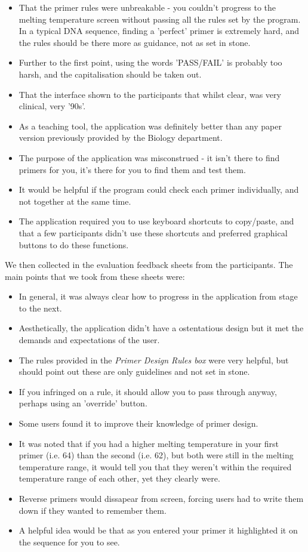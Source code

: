\begin{itemize}

\item That the primer rules were unbreakable - you couldn't progress to the melting temperature screen without passing all the rules set by the program. In a typical DNA sequence, finding a 'perfect' primer is extremely hard, and the rules should be there more as guidance, not as set in stone.
\item Further to the first point, using the words 'PASS/FAIL' is probably too harsh, and the capitalisation should be taken out.
\item That the interface shown to the participants that whilst clear, was very clinical, very '90s'.
\item As a teaching tool, the application was definitely better than any paper version previously provided by the Biology department.
\item The purpose of the application was misconstrued - it isn't there to find primers for you, it's there for you to find them and test them.
\item It would be helpful if the program could check each primer individually, and not together at the same time.
\item The application required you to use keyboard shortcuts to copy/paste, and that a few participants didn't use these shortcuts and preferred graphical buttons to do these functions.
\end{itemize}

We then collected in the evaluation feedback sheets from the participants. The main points that we took from these sheets were:

\begin{itemize}

\item In general, it was always clear how to progress in the application from stage to the next.
\item Aesthetically, the application didn't have a ostentatious design but it met the demands and expectations of the user.
\item The rules provided in the \emph{Primer Design Rules box} were very helpful, but should point out these are only guidelines and not set in stone.
\item If you infringed on a rule, it should allow you to pass through anyway, perhaps using an 'override' button.
\item Some users found it to improve their knowledge of primer design.
\item It was noted that if you had a higher melting temperature in your first primer (i.e. 64) than the second (i.e. 62), but both were still in the melting temperature range, it would tell you that they weren't within the required temperature range of each other, yet they clearly were.
\item Reverse primers would dissapear from screen, forcing users had to write them down if they wanted to remember them.
\item A helpful idea would be that as you entered your primer it highlighted it on the sequence for you to see.

\end{itemize}

